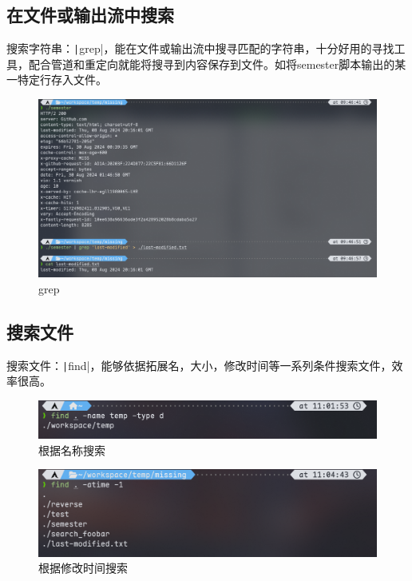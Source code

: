\documentclass[fontset=ubuntu]{ctexart}
\begin{document}
\begin{sloppypar}
\subsection{在文件或输出流中搜索}
搜索字符串：\texttt|grep|，能在文件或输出流中搜寻匹配的字符串，十分好用的寻找工具，配合管道和重定向就能将搜寻到内容保存到文件。如将semester脚本输出的某一特定行存入文件。
\begin{figure}[htb]
    \centering
    \includegraphics[width=0.75\linewidth]{grep_1.png}
    \caption{grep}
    \label{fig:grep_1}
\end{figure}

\subsection{搜索文件}
搜索文件：\texttt|find|，能够依据拓展名，大小，修改时间等一系列条件搜索文件，效率很高。
\begin{figure}[htb]
    \centering
    \includegraphics[width=0.75\linewidth]{find_name_1.png}
    \caption{根据名称搜索}
    \label{fig:find_name_1}
\end{figure}

\begin{figure}[htb]
    \centering
    \includegraphics[width=0.75\linewidth]{find_time_1.png}
    \caption{根据修改时间搜索}
    \label{fig:find_time_1}
\end{figure}


\end{sloppypar}
\end{document}
